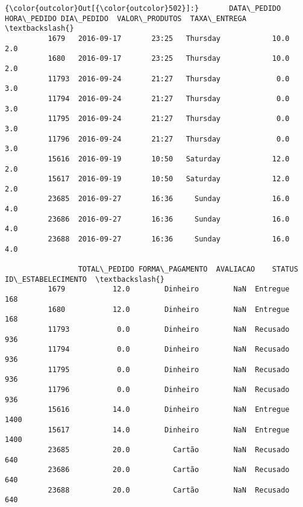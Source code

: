 \documentclass[11pt]{article}
\begin{document}
\begin{Verbatim}[commandchars=\\\{\}]
{\color{outcolor}Out[{\color{outcolor}502}]:}       DATA\_PEDIDO HORA\_PEDIDO DIA\_PEDIDO  VALOR\_PRODUTOS  TAXA\_ENTREGA  \textbackslash{}
          1679   2016-09-17       23:25   Thursday            10.0           2.0   
          1680   2016-09-17       23:25   Thursday            10.0           2.0   
          11793  2016-09-24       21:27   Thursday             0.0           3.0   
          11794  2016-09-24       21:27   Thursday             0.0           3.0   
          11795  2016-09-24       21:27   Thursday             0.0           3.0   
          11796  2016-09-24       21:27   Thursday             0.0           3.0   
          15616  2016-09-19       10:50   Saturday            12.0           2.0   
          15617  2016-09-19       10:50   Saturday            12.0           2.0   
          23685  2016-09-27       16:36     Sunday            16.0           4.0   
          23686  2016-09-27       16:36     Sunday            16.0           4.0   
          23688  2016-09-27       16:36     Sunday            16.0           4.0   
          
                 TOTAL\_PEDIDO FORMA\_PAGAMENTO  AVALIACAO    STATUS  ID\_ESTABELECIMENTO  \textbackslash{}
          1679           12.0        Dinheiro        NaN  Entregue                 168   
          1680           12.0        Dinheiro        NaN  Entregue                 168   
          11793           0.0        Dinheiro        NaN  Recusado                 936   
          11794           0.0        Dinheiro        NaN  Recusado                 936   
          11795           0.0        Dinheiro        NaN  Recusado                 936   
          11796           0.0        Dinheiro        NaN  Recusado                 936   
          15616          14.0        Dinheiro        NaN  Entregue                1400   
          15617          14.0        Dinheiro        NaN  Entregue                1400   
          23685          20.0          Cartão        NaN  Recusado                 640   
          23686          20.0          Cartão        NaN  Recusado                 640   
          23688          20.0          Cartão        NaN  Recusado                 640   
          

\end{Verbatim}
\end{document}
